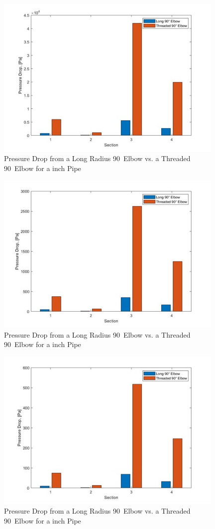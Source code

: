 \medskip
\begin{figure}[H]
    \centering
    \includegraphics[width=11cm]{images/pressure_drops_elbows1.jpg}
    \caption{Pressure Drop from a Long Radius 90\textdegree \ Elbow vs. a Threaded 90\textdegree \ Elbow for a  inch Pipe}
\end{figure}
\begin{figure}[H]
    \centering
    \includegraphics[width=11cm]{images/pressure_drops_elbows2.jpg}
    \caption{Pressure Drop from a Long Radius 90\textdegree \ Elbow vs. a Threaded 90\textdegree \ Elbow for a  inch Pipe}
\end{figure}
\begin{figure}[H]
    \centering
    \includegraphics[width=11cm]{images/pressure_drops_elbows3.jpg}
    \caption{Pressure Drop from a Long Radius 90\textdegree \ Elbow vs. a Threaded 90\textdegree \ Elbow for a  inch Pipe}
\end{figure}
